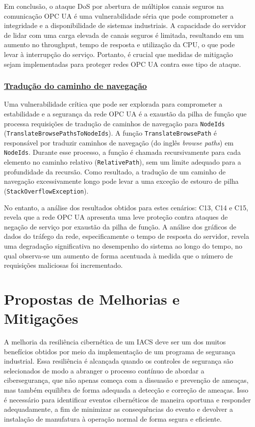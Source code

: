 Em conclusão, o ataque DoS por abertura de múltiplos canais seguros na comunicação OPC UA é uma vulnerabilidade séria que pode comprometer a integridade e a disponibilidade de sistemas industriais. A capacidade do servidor de lidar com uma carga elevada de canais seguros é limitada, resultando em um aumento no throughput, tempo de resposta e utilização da CPU, o que pode levar à interrupção do serviço. Portanto, é crucial que medidas de mitigação sejam implementadas para proteger redes OPC UA contra esse tipo de ataque.

\subsubsection*{\underline{Tradução do caminho de navegação}}

Uma vulnerabilidade crítica que pode ser explorada para comprometer a estabilidade e a segurança da rede OPC UA é a exaustão da pilha de função que processa requisições de tradução de caminhos de navegação para \texttt{NodeIds} (\texttt{TranslateBrowsePathsToNodeIds}). A função \texttt{TranslateBrowsePath} é responsável por traduzir caminhos de navegação (do inglês \textit{browse paths}) em \texttt{NodeIds}. Durante esse processo, a função é chamada recursivamente para cada elemento no caminho relativo (\texttt{RelativePath}), sem um limite adequado para a profundidade da recursão. Como resultado, a tradução de um caminho de navegação excessivamente longo pode levar a uma exceção de estouro de pilha (\texttt{StackOverflowException}).

No entanto, a análise dos resultados obtidos para estes cenários: C13, C14 e C15, revela que a rede OPC UA apresenta uma leve proteção contra ataques de negação de serviço por exaustão da pilha de função. A análise dos gráficos de dados do tráfego da rede, especificamente o tempo de resposta do servidor, revela uma degradação significativa no desempenho do sistema ao longo do tempo, no qual observa-se um aumento de forma acentuada à medida que o número de requisições maliciosas foi incrementado.


\section{Propostas de Melhorias e Mitigações} \label{sec:melhorias-mitigacoes}

A melhoria da resiliência cibernética de um IACS deve ser um dos muitos benefícios obtidos por meio da implementação de um programa de segurança industrial. Essa resiliência é alcançada quando os controles de segurança são selecionados de modo a abranger o processo contínuo de abordar a cibersegurança, que não apenas começa com a dissuasão e prevenção de ameaças, mas também equilibra de forma adequada a detecção e correção de ameaças. Isso é necessário para identificar eventos cibernéticos de maneira oportuna e responder adequadamente, a fim de minimizar as consequências do evento e devolver a instalação de manufatura à operação normal de forma segura e eficiente.


